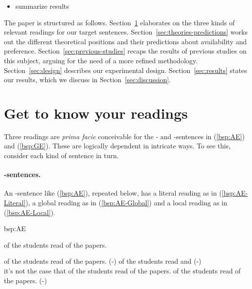 \documentclass[fleqn,reqno,10pt,draft]{article}
\newcommand{\lit}{\acro{lit}}
\newcommand{\glb}{\acro{glb}}
\newcommand{\loc}{\acro{loc}}
\newcommand{\as}{\acro{as}}
\renewcommand{\es}{\acro{es}}
\begin{document}
\begin{itemize}
\item summarize results
\end{itemize}

The paper is structured as follows. Section~\ref{sec:get-know-your}
elaborates on the three kinds of relevant readings for our target
sentences. Section~\ref{sec:theories-predictions} works out the
different theoretical positions and their predictions about
availability and preference. Section~\ref{sec:previous-studies} recaps
the results of previous studies on this subject, arguing for the need
of a more refined methodology. Section~\ref{sec:design} describes our
experimental design. Section~\ref{sec:results} states our results,
which we discuss in Section~\ref{sec:discussion}.

\section{Get to know your readings}
\label{sec:get-know-your}

Three readings are \emph{prima facie} conceivable for the \as- and
\es-sentences in (\ref{bsp:AE}) and (\ref{bsp:GE}). These are
logically dependent in intricate ways. To see this, consider each kind
of sentence in turn.

\paragraph{\as-sentences.}

An \as-sentence like (\ref{bsp:AE}), repeated below, has a literal
reading as in (\ref{bsp:AE-Literal}), a global reading as in
(\ref{bsp:AE-Global}) and a local reading as in (\ref{bsp:AE-Local}).

\begin{exer}{bsp:AE}

  \ex {} of the students read {} of the
  papers. 

  \begin{xlist}
  \ex {} of the students read
    {} of the papers. \hfill (\as-\lit)
  \ex
     of the students read  
    and  \hfill (\as-\glb)\\
    it's not the case that  of the students read  of the papers.
  \ex
     of the students read {} of the
    papers. \hfill (\as-\loc)
  \end{xlist}
\end{exer}
\end{document}
